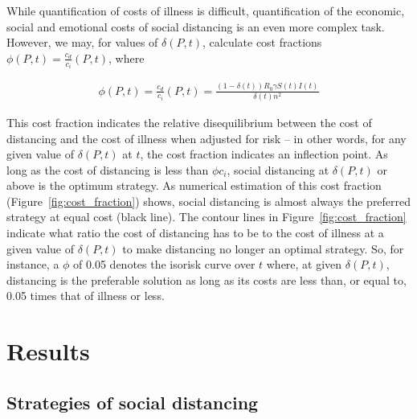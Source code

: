 \documentclass[12pt]{article}
\begin{document}
While quantification of costs of illness is difficult, quantification of the economic, social and emotional costs of social distancing is an even more complex task. However, we may, for values of $\delta(P, t)$, calculate cost fractions $\phi(P, t) = \frac{c_d}{c_i}(P, t)$, where

\begin{equation}
	\begin{aligned}
		\phi(P, t) = \frac{c_d}{c_i}(P, t) = \frac{(1 - \delta(t)) R_0 \gamma S(t) I(t)}{\delta(t) n^2}
	\end{aligned}
	\label{eq:cost_fraction}
\end{equation}

This cost fraction indicates the relative disequilibrium between the cost of distancing and the cost of illness when adjusted for risk -- in other words, for any given value of $\delta(P, t)$ at $t$, the cost fraction indicates an inflection point. As long as the cost of distancing is less than $\phi c_i$, social distancing at $\delta(P, t)$ or above is the optimum strategy. As numerical estimation of this cost fraction (Figure~\ref{fig:cost_fraction}) shows, social distancing is almost always the preferred strategy at equal cost (black line). The contour lines in Figure~\ref{fig:cost_fraction} indicate what ratio the cost of distancing has to be to the cost of illness at a given value of $\delta(P, t)$ to make distancing no longer an optimal strategy. So, for instance, a $\phi$ of 0.05 denotes the isorisk curve over $t$ where, at given $\delta(P, t)$, distancing is the preferable solution as long as its costs are less than, or equal to, 0.05 times that of illness or less. 



\section{Results} %
\label{sec:results}

\subsection{Strategies of social distancing} %
\label{sub:strategies_of_social_distancing}
\end{document}
